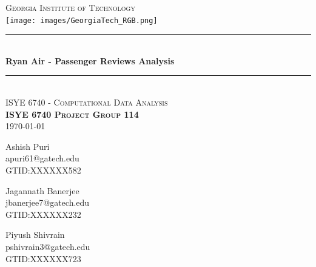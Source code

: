 \documentclass[11pt]{article} %
\begin{document}
    \begin{titlepage}
    
    \newcommand{\HRule}{\rule{\linewidth}{0.5mm}} %
    
    \center %
    
    \textsc{\LARGE Georgia Institute of Technology}\\[1.5cm] %
    \texttt{[image: images/GeorgiaTech\_RGB.png]}\\[1cm] %
    
    
    \HRule \\[0.4cm]
    { \huge \bfseries Ryan Air - Passenger Reviews Analysis}\\[0.4cm] %
    \HRule \\[1.5cm]
    
    \textsc{\Large ISYE 6740 -  Computational Data Analysis}\\[0.5cm]
    \textsc{\large \textbf{ISYE 6740 Project Group 114}}\\[0.6cm]
    {\large \today}\\[2cm]
    \begin{center}
    \begin{minipage}{0.33\textwidth}
        \centering
        {\Large Ashish Puri} \\
        apuri61@gatech.edu \\
        GTID:XXXXXX582
    \end{minipage}%
    \begin{minipage}{0.33\textwidth}
        \centering
        {\Large Jagannath Banerjee} \\
        jbanerjee7@gatech.edu \\
        GTID:XXXXXX232
    \end{minipage}
    \begin{minipage}{0.33\textwidth}
        \centering
        {\Large Piyush Shivrain} \\
        pshivrain3@gatech.edu \\
        GTID:XXXXXX723
    \end{minipage}
    \end{center}
\end{titlepage}
\end{document}
